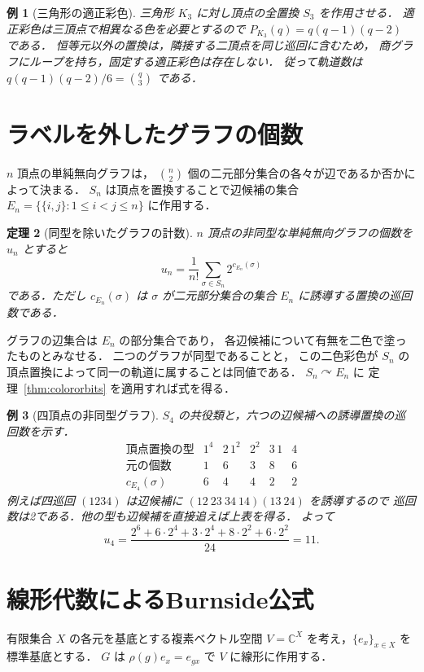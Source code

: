 \documentclass[a5paper,10pt,onecolumn]{jsarticle}
\makeatletter
\theoremstyle{mathnotetheorem}
\newtheorem{theorem}{定理}[section]
\newtheorem{example}[theorem]{例}
\renewcommand{\proofname}{証明}
\renewenvironment{proof}[1][\proofname]{%
  \par\pushQED{\qed}\normalfont\topsep4\p@\@plus2\p@\relax
  \trivlist\item[\hskip\labelsep\bfseries #1]\ignorespaces
}{\popQED\endtrivlist\@endpefalse}
\makeatother
\begin{document}
\begin{example}[三角形の適正彩色]
三角形 $K_3$ に対し頂点の全置換 $S_3$ を作用させる．
適正彩色は三頂点で相異なる色を必要とするので
$P_{K_3}(q)=q(q-1)(q-2)$ である．
恒等元以外の置換は，隣接する二頂点を同じ巡回に含むため，
商グラフにループを持ち，固定する適正彩色は存在しない．
従って軌道数は $q(q-1)(q-2)/6={q\choose3}$ である．
\end{example}

\section{ラベルを外したグラフの個数}
$n$ 頂点の単純無向グラフは，
$\binom n2$ 個の二元部分集合の各々が辺であるか否かによって決まる．
$S_n$ は頂点を置換することで辺候補の集合
$E_n=\{\{i,j\}:1\le i<j\le n\}$ に作用する．

\begin{theorem}[同型を除いたグラフの計数]\label{thm:unlabeledgraphs}
$n$ 頂点の非同型な単純無向グラフの個数を $u_n$ とすると
\[
 u_n=\frac1{n!}\sum_{\sigma\in S_n}
 2^{c_{E_n}(\sigma)}
\]
である．ただし $c_{E_n}(\sigma)$ は
$\sigma$ が二元部分集合の集合 $E_n$ に誘導する置換の巡回数である．
\end{theorem}
\begin{proof}
グラフの辺集合は $E_n$ の部分集合であり，
各辺候補について有無を二色で塗ったものとみなせる．
二つのグラフが同型であることと，
この二色彩色が $S_n$ の頂点置換によって同一の軌道に属することは同値である．
$S_n\curvearrowright E_n$ に
定理~\ref{thm:colororbits} を適用すれば式を得る．
\end{proof}

\begin{example}[四頂点の非同型グラフ]
$S_4$ の共役類と，六つの辺候補への誘導置換の巡回数を示す．
\[
\begin{array}{c|ccccc}
 \text{頂点置換の型}&1^4&2\,1^2&2^2&3\,1&4\\\hline
 \text{元の個数}&1&6&3&8&6\\
 c_{E_4}(\sigma)&6&4&4&2&2
\end{array}
\]
例えば四巡回 $(1234)$ は辺候補に
$(12\ 23\ 34\ 14)(13\ 24)$ を誘導するので
巡回数は2である．他の型も辺候補を直接追えば上表を得る．
よって
\[
 u_4=\frac{2^6+6\cdot2^4+3\cdot2^4+
 8\cdot2^2+6\cdot2^2}{24}=11.
\]
\end{example}

\section{線形代数によるBurnside公式}
有限集合 $X$ の各元を基底とする複素ベクトル空間
$V=\mathbb C^X$ を考え，$\{e_x\}_{x\in X}$ を標準基底とする．
$G$ は $\rho(g)e_x=e_{gx}$ で $V$ に線形に作用する．
\end{document}
